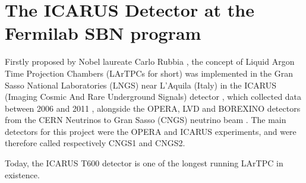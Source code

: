 
\chapter{The ICARUS Detector at the Fermilab SBN program}
\label{chap:icarus_detector}

Firstly proposed by Nobel laureate Carlo Rubbia \cite{Rubbia:1977zz}, the concept of Liquid Argon Time Projection Chambers (LArTPCs for short) was implemented in the Gran Sasso National Laboratories (LNGS) near L'Aquila (Italy) in the ICARUS (Imaging Cosmic And Rare Underground Signals) detector \cite{Bettini:1991fh, Cennini:1994pk, Cennini:1995tt, ICARUS:1995nrd}, which collected data between 2006 and 2011 \cite{Rubbia:2011ft}, alongside the OPERA, LVD and BOREXINO detectors from the CERN Neutrinos to Gran Sasso (CNGS) neutrino beam \cite{Kodama:2004db}. The main detectors for this project were the OPERA and ICARUS experiments, and were therefore called respectively CNGS1 and CNGS2.

Today, the ICARUS T600 detector is one of the longest running LArTPC in existence. 




